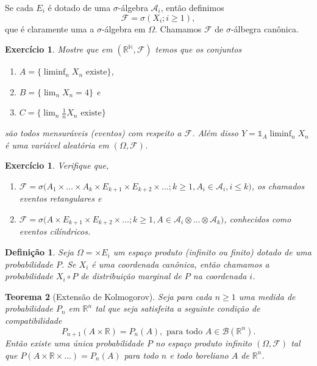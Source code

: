 \documentclass[reqno, final]{book}
\newcommand*\1{\mathds{1}}
\newtheorem{theorem}{Teorema}[section]
\newtheorem{definition}[theorem]{Definição}
\newtheorem{exercise}[example]{Exercício}
\begin{document}
Se cada $E_i$ é dotado de uma $\sigma$-álgebra $\mathcal{A}_i$, então definimos
\begin{equation}
  \mathcal{F} = \sigma(X_i; i \geq 1),
\end{equation}
que é claramente uma a $\sigma$-álgebra em $\Omega$.
Chamamos $\mathcal{F}$ de $\sigma$-álbegra canônica.

\begin{exercise}
  Mostre que em $(\mathbb{R}^{\mathbb{N}},\mathcal{F})$ temos que os conjuntos
  \begin{enumerate}[\quad a)]
  \item $A = \{ \liminf_n X_n \text{ existe}\}$,
  \item $B = \{ \lim_n X_n = 4\}$ e
  \item $C = \{ \lim_n \tfrac{1}{n} X_n \text{ existe}\}$
  \end{enumerate}
  são todos mensuráveis (eventos) com respeito a $\mathcal{F}$.
  Além disso $Y = \1_A \liminf_n X_n$ é uma variável aleatória em $(\Omega, \mathcal{F})$.
\end{exercise}

\begin{exercise}
  Verifique que,
  \begin{enumerate}[\quad a)]
  \item $\mathcal{F} = \sigma\big(A_1 \times \dots \times A_k \times E_{k+1} \times E_{k+2} \times \dots; k \geq 1, A_i \in \mathcal{A}_i, i \leq k\big)$, os chamados eventos retangulares e
  \item $\mathcal{F} = \sigma\big(A \times E_{k+1} \times E_{k+2} \times \dots; k \geq 1, A \in \mathcal{A}_i \otimes \dots \otimes \mathcal{A}_k\big)$, conhecidos como eventos cilíndricos.
  \end{enumerate}
\end{exercise}

\begin{definition}
  \label{d:marginal}
  Seja $\Omega = \times E_i$ um espaço produto (infinito ou finito) dotado de uma probabilidade $P$.
  Se $X_i$ é uma coordenada canônica, então chamamos a probabilidade $X_i \circ P$ de \emph{distribuição marginal}  de $P$ na coordenada $i$.
\end{definition}

\begin{theorem}[Extensão de Kolmogorov]
  \label{t:extens_kolmog}
  Seja para cada $n \geq 1$ uma medida de probabilidade $P_n$ em $\mathbb{R}^n$ tal que seja satisfeita a seguinte condição de compatibilidade 
  \begin{equation}
    \label{e:consist_kolmog}
    P_{n+1} (A \times \mathbb{R}) = P_n (A), \text{ para todo $A \in \mathcal{B}(\mathbb{R}^n)$}.
  \end{equation}
  Então existe uma única probabilidade $P$ no espaço produto infinito $(\Omega, \mathcal{F})$ tal que $P(A \times \mathbb{R} \times \dots) = P_n (A)$ para todo $n$ e todo boreliano $A$ de $\mathbb{R}^n$.
\end{theorem}
\end{document}
